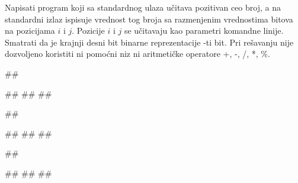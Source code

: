 \begin{Exercise}[label=209]%
Napisati program koji sa standardnog ulaza učitava pozitivan ceo broj, a na standardni izlaz ispisuje vrednost tog broja sa razmenjenim vrednostima bitova na pozicijama $i$ i $j$. Pozicije $i$ i $j$ se učitavaju kao parametri
  komandne linije. Smatrati da je krajnji desni bit binarne
  reprezentacije -ti bit. Pri rešavanju nije dozvoljeno koristiti
  ni pomoćni niz ni aritmetičke operatore +, -, /, *, \%.

\begin{minitest}
\begin{upotreba}{1}
##

#\naslovInt#
##
##
\end{upotreba}
\end{minitest}
\begin{minitest}
\begin{upotreba}{2}
##

#\naslovInt#
##
##
\end{upotreba}
\end{minitest}
\begin{minitest}
\begin{upotreba}{2}
##

#\naslovInt#
##
##
\end{upotreba}
\end{minitest}

\end{Exercise}

